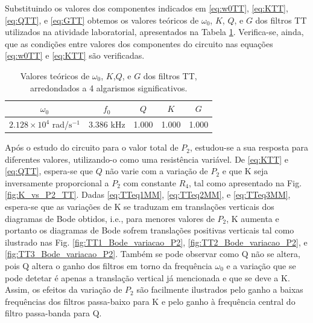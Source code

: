 Substituindo os valores dos componentes indicados em \eqref{eq:w0TT}, \eqref{eq:KTT}, \eqref{eq:QTT}, e \eqref{eq:GTT} obtemos os valores teóricos de $\omega_0$, $K$, $Q$, e $G$ dos filtros TT utilizados na atividade laboratorial, apresentados na Tabela \ref{tab:parTT}. Verifica-se, ainda, que as condições entre valores dos componentes do circuito nas equações \eqref{eq:w0TT} e \eqref{eq:KTT} são verificadas.

\begin{table}[h!]
    \centering
        \caption{Valores teóricos de $\omega_0$, $K$,$Q$, e $G$ dos filtros TT, arredondados a 4 algarismos significativos.}
    \begin{tabular}{ccccc}
        \hline
         $\omega_0$ & $f_0$ & $Q$ & $K$ & $G$ \\
         \hline
         $2.128 \times 10^{4}$ rad/$\mathrm{s^{-1}}$ & 3.386 kHz & 1.000 & 1.000 & 1.000\\
          \hline
    \end{tabular}

    \label{tab:parTT}
\end{table}

Após o estudo do circuito para o valor total de $P_2$, estudou-se a sua resposta para diferentes valores, utilizando-o como uma resistência variável. De \eqref{eq:KTT} e \eqref{eq:QTT}, espera-se que $Q$ não varie com a variação de $P_2$ e que K seja inversamente proporcional a $P_2$ com constante $R_4$, tal como apresentado na Fig. \ref{fig:K_vs_P2_TT}. Dadas \eqref{eq:TTeq1MM}, \eqref{eq:TTeq2MM}, e \eqref{eq:TTeq3MM}, espera-se que as variações de K se traduzam em translações verticais dos diagramas de Bode obtidos, i.e., para menores valores de $P_2$, K aumenta e portanto os diagramas de Bode sofrem translações positivas verticais tal como ilustrado nas Fig. \ref{fig:TT1_Bode_variacao_P2}, \ref{fig:TT2_Bode_variacao_P2}, e \ref{fig:TT3_Bode_variacao_P2}. Também se pode observar como Q não se altera, pois Q altera o ganho dos filtros em torno da frequência $\omega_0$ e a variação que se pode detetar é apenas a translação vertical já mencionada e que se deve a K. Assim, os efeitos da variação de $P_2$ são facilmente ilustrados pelo ganho a baixas frequências dos filtros passa-baixo para K e pelo ganho à frequência central do filtro passa-banda para Q.

